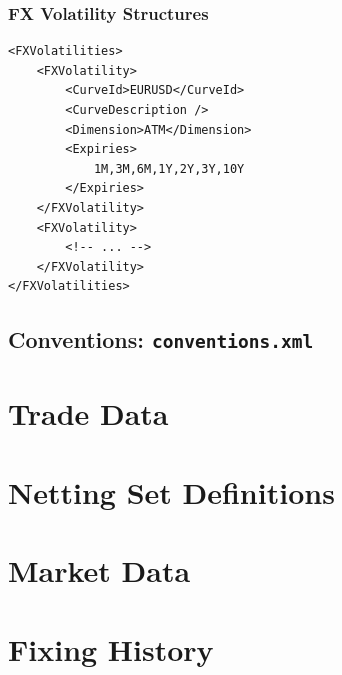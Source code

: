 \documentclass[12pt, a4paper]{article}
\begin{document}
\subsubsection{FX Volatility Structures}

\begin{lstlisting}[caption={FX option volatility configuration}, 	label=lst:fxoptionvol_configuration]
<FXVolatilities>
	<FXVolatility>
		<CurveId>EURUSD</CurveId>
		<CurveDescription />
		<Dimension>ATM</Dimension>
		<Expiries>
			1M,3M,6M,1Y,2Y,3Y,10Y
		</Expiries>
	</FXVolatility>
	<FXVolatility>
		<!-- ... -->
	</FXVolatility>
</FXVolatilities>

\end{lstlisting}

\subsection{Conventions: {\tt conventions.xml}}




\section{Trade Data}\label{sec:portfolio_data}



\section{Netting Set Definitions}\label{sec:nettingsetinput}



\section{Market Data}\label{sec:market_data}



\section{Fixing History}
\end{document}
